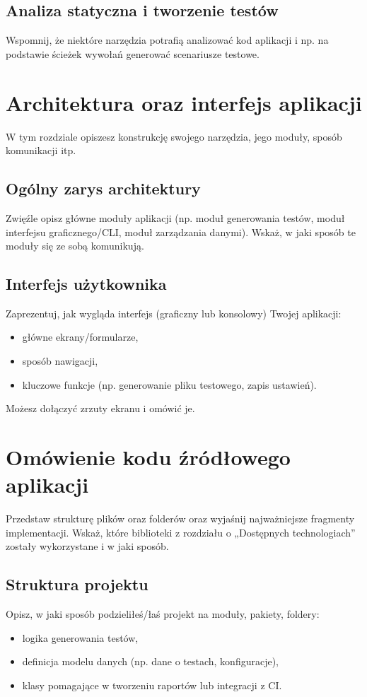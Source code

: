 \documentclass[12pt]{report}
\begin{document}
\section{Analiza statyczna i tworzenie testów}
{Wspomnij, że niektóre narzędzia potrafią analizować kod aplikacji i np. na podstawie ścieżek wywołań generować scenariusze testowe.}

\chapter{Architektura oraz interfejs aplikacji}
{W tym rozdziale opiszesz konstrukcję swojego narzędzia, jego moduły, sposób komunikacji itp.}

\section{Ogólny zarys architektury}
{Zwięźle opisz główne moduły aplikacji (np. moduł generowania testów, moduł interfejsu graficznego/CLI, moduł zarządzania danymi). Wskaż, w jaki sposób te moduły się ze sobą komunikują.}

\section{Interfejs użytkownika}
{Zaprezentuj, jak wygląda interfejs (graficzny lub konsolowy) Twojej aplikacji:
\begin{itemize}
    \item główne ekrany/formularze,
    \item sposób nawigacji,
    \item kluczowe funkcje (np. generowanie pliku testowego, zapis ustawień).
\end{itemize}
Możesz dołączyć zrzuty ekranu i omówić je.}

\chapter{Omówienie kodu źródłowego aplikacji}
{Przedstaw strukturę plików oraz folderów oraz wyjaśnij najważniejsze fragmenty implementacji. Wskaż, które biblioteki z rozdziału o „Dostępnych technologiach” zostały wykorzystane i w jaki sposób.}

\section{Struktura projektu}
{Opisz, w jaki sposób podzieliłeś/łaś projekt na moduły, pakiety, foldery:
\begin{itemize}
    \item logika generowania testów,
    \item definicja modelu danych (np. dane o testach, konfiguracje),
    \item klasy pomagające w tworzeniu raportów lub integracji z CI.
\end{itemize}}
\end{document}
